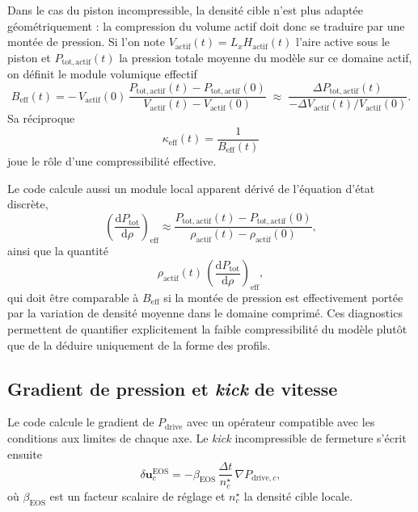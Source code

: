 \documentclass[11pt,a4paper]{article}
\begin{document}
Dans le cas du piston incompressible, la densité cible n'est plus adaptée géométriquement : la compression du volume actif doit donc se traduire par une montée de pression. Si l'on note \(V_{\mathrm{actif}}(t)=L_x H_{\mathrm{actif}}(t)\) l'aire active sous le piston et \(P_{\mathrm{tot,actif}}(t)\) la pression totale moyenne du modèle sur ce domaine actif, on définit le module volumique effectif
\begin{equation}
 B_{\mathrm{eff}}(t)
 =
 -\,V_{\mathrm{actif}}(0)\,
 \frac{P_{\mathrm{tot,actif}}(t)-P_{\mathrm{tot,actif}}(0)}
 {V_{\mathrm{actif}}(t)-V_{\mathrm{actif}}(0)}
 \;\approx\;
 \frac{\Delta P_{\mathrm{tot,actif}}(t)}{-\Delta V_{\mathrm{actif}}(t)/V_{\mathrm{actif}}(0)}.
\end{equation}
Sa réciproque
\begin{equation}
 \kappa_{\mathrm{eff}}(t)=\frac{1}{B_{\mathrm{eff}}(t)}
\end{equation}
joue le rôle d'une compressibilité effective.

Le code calcule aussi un module local apparent dérivé de l'équation d'état discrète,
\begin{equation}
 \left(\frac{\mathrm d P_{\mathrm{tot}}}{\mathrm d \rho}\right)_{\mathrm{eff}}
 \approx
 \frac{P_{\mathrm{tot,actif}}(t)-P_{\mathrm{tot,actif}}(0)}
 {\rho_{\mathrm{actif}}(t)-\rho_{\mathrm{actif}}(0)},
\end{equation}
ainsi que la quantité
\begin{equation}
 \rho_{\mathrm{actif}}(t)\,
 \left(\frac{\mathrm d P_{\mathrm{tot}}}{\mathrm d \rho}\right)_{\mathrm{eff}},
\end{equation}
qui doit être comparable à \(B_{\mathrm{eff}}\) si la montée de pression est effectivement portée par la variation de densité moyenne dans le domaine comprimé. Ces diagnostics permettent de quantifier explicitement la faible compressibilité du modèle plutôt que de la déduire uniquement de la forme des profils.

\subsection{Gradient de pression et \emph{kick} de vitesse}

Le code calcule le gradient de $P_{\mathrm{drive}}$ avec un opérateur compatible avec les conditions aux limites de chaque axe. Le \emph{kick} incompressible de fermeture s'écrit ensuite
\begin{equation}
 \delta \bm{u}_c^{\mathrm{EOS}} = -\beta_{\mathrm{EOS}}\,\frac{\Delta t}{n_c^{\star}}\,\nabla P_{\mathrm{drive},c},
\end{equation}
où $\beta_{\mathrm{EOS}}$ est un facteur scalaire de réglage et $n_c^{\star}$ la densité cible locale.
\end{document}
